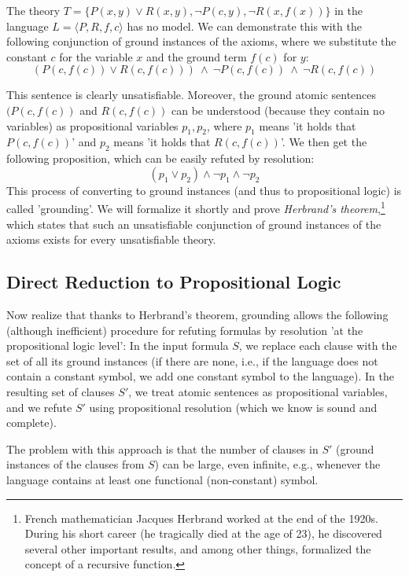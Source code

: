 \begin{example}
    The theory $T=\{P(x,y)\lor R(x,y),\neg P(c,y),\neg R(x,f(x))\}$ in the language $L=\langle P,R,f,c \rangle$ has no model. We can demonstrate this with the following conjunction of ground instances of the axioms, where we substitute the constant $c$ for the variable $x$ and the ground term $f(c)$ for $y$:
$$
(P(c,f(c))\lor R(c,f(c)))\ \land\ \neg P(c,f(c))\ \land\ \neg R(c,f(c))
$$
\end{example}
This sentence is clearly unsatisfiable. Moreover, the ground atomic sentences $(P(c,f(c))$ and $R(c,f(c))$ can be understood (because they contain no variables) as propositional variables $p_1,p_2$, where $p_1$ means 'it holds that $P(c,f(c))$' and $p_2$ means 'it holds that $R(c,f(c))$'. We then get the following proposition, which can be easily refuted by resolution:
$$
(p_1 \lor p_2) \land \neg p_1 \land \neg p_2
$$
This process of converting to ground instances (and thus to propositional logic) is called 'grounding'. We will formalize it shortly and prove \emph{Herbrand's theorem},\footnote{French mathematician Jacques Herbrand worked at the end of the 1920s. During his short career (he tragically died at the age of 23), he discovered several other important results, and among other things, formalized the concept of a recursive function.} which states that such an unsatisfiable conjunction of ground instances of the axioms exists for every unsatisfiable theory.

\subsection{Direct Reduction to Propositional Logic}

Now realize that thanks to Herbrand's theorem, grounding allows the following (although inefficient) procedure for refuting formulas by resolution 'at the propositional logic level': In the input formula $S$, we replace each clause with the set of all its ground instances (if there are none, i.e., if the language does not contain a constant symbol, we add one constant symbol to the language). In the resulting set of clauses $S'$, we treat atomic sentences as propositional variables, and we refute $S'$ using propositional resolution (which we know is sound and complete).

The problem with this approach is that the number of clauses in $S'$ (ground instances of the clauses from $S$) can be large, even infinite, e.g., whenever the language contains at least one functional (non-constant) symbol.

